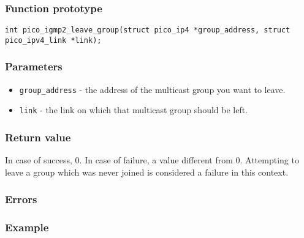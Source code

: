 \subsubsection*{Function prototype}
\texttt{int pico\_igmp2\_leave\_group(struct pico\_ip4 *group\_address, struct pico\_ipv4\_link *link);}

\subsubsection*{Parameters}
\begin{itemize}
\item \texttt{group\_address} - the address of the multicast group you want to leave.
\item \texttt{link} - the link on which that multicast group should be left.
\end{itemize}

\subsubsection*{Return value}
In case of success, 0. In case of failure, a value different from 0. Attempting to leave a group which was never joined is considered a failure in this context. 

\subsubsection*{Errors}

\subsubsection*{Example}



